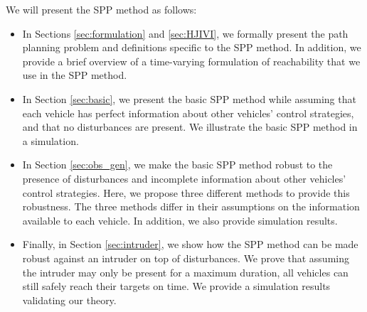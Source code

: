 We will present the SPP method as follows:
\begin{itemize}
\item In Sections \ref{sec:formulation} and \ref{sec:HJIVI}, we formally present the path planning problem and definitions specific to the SPP method. In addition, we provide a brief overview of a time-varying formulation of reachability that we use in the SPP method.
\item In Section \ref{sec:basic}, we present the basic SPP method while assuming that each vehicle has perfect information about other vehicles' control strategies, and that no disturbances are present. We illustrate the basic SPP method in a simulation.
\item In Section \ref{sec:obs_gen}, we make the basic SPP method robust to the presence of disturbances and incomplete information about other vehicles' control strategies. Here, we propose three different methods to provide this robustness. The three methods differ in their assumptions on the information available to each vehicle. In addition, we also provide simulation results.
\item Finally, in Section \ref{sec:intruder}, we show how the SPP method can be made robust against an intruder on top of disturbances. We prove that assuming the intruder may only be present for a maximum duration, all vehicles can still safely reach their targets on time. We provide a simulation results validating our theory.
\end{itemize}

